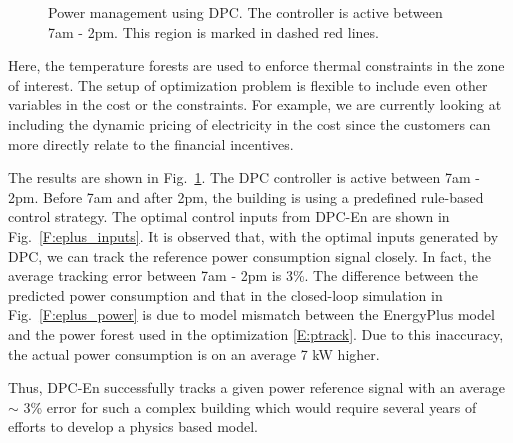 \begin{figure}[h!]
	\begin{center}
\end{center}
	\caption{Power management using DPC. The controller is active between 7am - 2pm. This region is marked in dashed red lines.}
	\captionsetup{justification=centering}
	\label{F:eplus_track}
\end{figure}

Here, the temperature forests are used to enforce thermal constraints in the zone of interest. The setup of optimization problem is flexible to include even other variables in the cost or the constraints. For example, we are currently looking at including the dynamic pricing of electricity in the cost since the customers can more directly relate to the financial incentives.

The results are shown in Fig.~\ref{F:eplus_track}. 
The DPC controller is active between 7am - 2pm. Before 7am and after 2pm, the building is using a predefined rule-based control strategy.
The optimal control inputs from DPC-En are shown in Fig.~\ref{F:eplus_inputs}. It is observed that, with the optimal inputs generated by DPC, we can track the reference power consumption signal closely. In fact, the average tracking error between 7am - 2pm is 3\%. The difference between the predicted power consumption and that in the closed-loop simulation in Fig.~\ref{F:eplus_power} is due to model mismatch between the EnergyPlus model and the power forest used in the optimization \eqref{E:ptrack}. Due to this inaccuracy, the actual power consumption is on an average 7 kW higher.

Thus, DPC-En successfully tracks a given power reference signal with an average $\sim$ 3\% error for such a complex building which would require several years of efforts to develop a physics based model.

